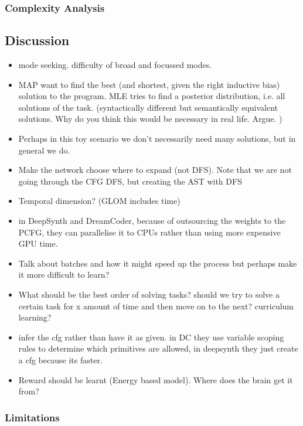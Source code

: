 \subsubsection{Complexity Analysis}

\subsection{Discussion}
\begin{itemize}
    \item mode seeking. difficulty of broad and focussed modes. 
    \item MAP want to find the best (and shortest, given the right inductive bias) solution to the program. MLE tries to find a posterior distribution, i.e. all solutions of the task. (syntactically different but semantically equivalent solutions. Why do you think this would be necessary in real life. Argue. )
    \item Perhaps in this toy scenario we don't necessarily need many solutions, but in general we do. 
    \item Make the network choose where to expand (not DFS). Note that we are not going through the CFG DFS, but creating the AST with DFS
    \item Temporal dimension? (GLOM includes time)
    \item in DeepSynth and DreamCoder, because of outsourcing the weights to the PCFG, they can parallelise it to CPUs rather than using more expensive GPU time. 
    \item Talk about batches and how it might speed up the process but perhaps make it more difficult to learn?
    \item What should be the best order of solving tasks? should we try to solve a certain task for x amount of time and then move on to the next? curriculum learning? 
    \item infer the cfg rather than have it as given. in DC they use variable scoping rules to determine which primitives are allowed, in deepsynth they just create a cfg because its faster. 
    \item Reward should be learnt (Energy based model). Where does the brain get it from?
\end{itemize}


\subsubsection{Limitations}


